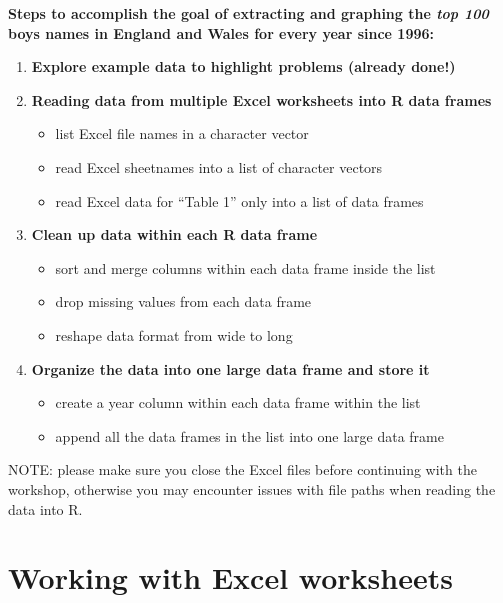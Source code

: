 \documentclass[
]{book}
\providecommand{\tightlist}{%
  \setlength{\itemsep}{0pt}\setlength{\parskip}{0pt}}
\begin{document}
\begin{alert}

\textbf{Steps to accomplish the goal of extracting and graphing the \emph{top 100} boys names in England and Wales for every year since 1996:}

\begin{enumerate}
\def\labelenumi{\arabic{enumi}.}
\setcounter{enumi}{-1}
\item
  \textbf{Explore example data to highlight problems (already done!)}
\item
  \textbf{Reading data from multiple Excel worksheets into R data frames}

  \begin{itemize}
  \tightlist
  \item
    list Excel file names in a character vector
  \item
    read Excel sheetnames into a list of character vectors
  \item
    read Excel data for ``Table 1'' only into a list of data frames
  \end{itemize}
\item
  \textbf{Clean up data within each R data frame}

  \begin{itemize}
  \tightlist
  \item
    sort and merge columns within each data frame inside the list
  \item
    drop missing values from each data frame
  \item
    reshape data format from wide to long
  \end{itemize}
\item
  \textbf{Organize the data into one large data frame and store it}

  \begin{itemize}
  \tightlist
  \item
    create a year column within each data frame within the list
  \item
    append all the data frames in the list into one large data frame
  \end{itemize}
\end{enumerate}

\end{alert}

NOTE: please make sure you close the Excel files before continuing with the
workshop, otherwise you may encounter issues with file paths when reading
the data into R.

\hypertarget{working-with-excel-worksheets}{%
\section{Working with Excel worksheets}\label{working-with-excel-worksheets}}
\end{document}
